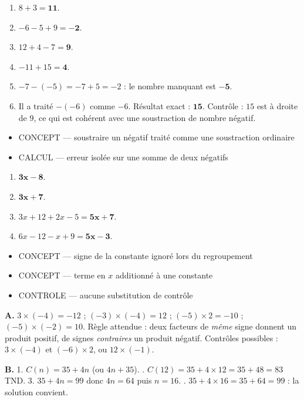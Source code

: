\documentclass[10pt,a4paper]{article}
\begin{document}
\begin{enumerate}
\item $8+3=\mathbf{11}$.
\item $-6-5+9=\mathbf{-2}$.
\item $12+4-7=\mathbf{9}$.
\item $-11+15=\mathbf{4}$.
\item $-7-(-5)=-7+5=-2$ : le nombre manquant est $\mathbf{-5}$.
\item Il a traité $-(-6)$ comme $-6$. Résultat exact : $\mathbf{15}$. Contrôle : $15$ est à droite de $9$, ce qui est cohérent avec une soustraction de nombre négatif.
\end{enumerate}
\begin{itemize}
\item \textsc{CONCEPT} --- soustraire un négatif traité comme une soustraction ordinaire
\item \textsc{CALCUL} --- erreur isolée sur une somme de deux négatifs
\end{itemize}
\begin{enumerate}
\item $\mathbf{3x-8}$.
\item $\mathbf{3x+7}$.
\item $3x+12+2x-5=\mathbf{5x+7}$.
\item $6x-12-x+9=\mathbf{5x-3}$.
\end{enumerate}
\begin{itemize}
\item \textsc{CONCEPT} --- signe de la constante ignoré lors du regroupement
\item \textsc{CONCEPT} --- terme en $x$ additionné à une constante
\item \textsc{CONTROLE} --- aucune substitution de contrôle
\end{itemize}

\textbf{A.} $3\times(-4)=-12$ ; $(-3)\times(-4)=12$ ; $(-5)\times 2=-10$ ; $(-5)\times(-2)=10$.
Règle attendue : deux facteurs de \emph{même} signe donnent un produit positif, de signes \emph{contraires}
un produit négatif. Contrôles possibles : $3\times(-4)$ et $(-6)\times 2$, ou $12\times(-1)$.

\textbf{B.} 1. $C(n)=35+4n$ (ou $4n+35$). . $C(12)=35+4\times 12=35+48=83$ TND.
3. $35+4n=99$ donc $4n=64$ puis $n=16$. . $35+4\times 16=35+64=99$ : la solution convient.
\end{document}
